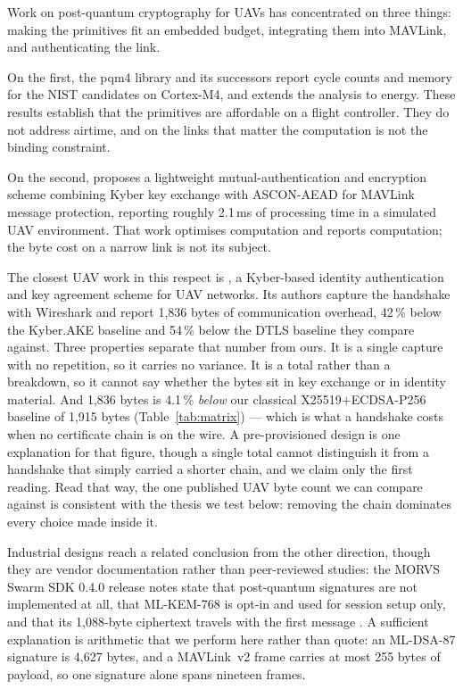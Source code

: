 \documentclass[drones,article,submit,pdftex,moreauthors]{Definitions/mdpi}
\newcommand{\mlkem}{ML-KEM}
\newcommand{\mldsa}{ML-DSA}
\newcommand{\mav}{MAVLink}
\begin{document}
Work on post-quantum cryptography for UAVs has concentrated on three
things: making the primitives fit an embedded budget, integrating them
into \mav{}, and authenticating the link.

On the first, the pqm4 library \cite{pqm4} and its successors report
cycle counts and memory for the NIST candidates on Cortex-M4, and
\cite{botros2019} extends the analysis to energy. These results
establish that the primitives are affordable on a flight controller.
They do not address airtime, and on the links that matter the
computation is not the binding constraint.

On the second, \cite{hussien2026pqmavlink} proposes a lightweight
mutual-authentication and encryption scheme combining Kyber key exchange
with ASCON-AEAD for \mav{} message protection, reporting roughly 2.1\,ms
of processing time in a simulated UAV environment. That work optimises
computation and reports computation; the byte cost on a narrow link is
not its subject.

The closest UAV work in this respect is \cite{xia2024ligkyx}, a
Kyber-based identity authentication and key agreement scheme for UAV
networks. Its authors capture the handshake with Wireshark and report
1{,}836 bytes of communication overhead, 42\,\% below the Kyber.AKE
baseline and 54\,\% below the DTLS baseline they compare against.
Three properties separate that number from ours. It is a single capture
with no repetition, so it carries no variance. It is a total rather
than a breakdown, so it cannot say whether the bytes sit in key
exchange or in identity material. And 1{,}836 bytes is 4.1\,\%
\emph{below} our classical X25519$+$ECDSA-P256 baseline of 1{,}915
bytes (Table~\ref{tab:matrix}) --- which is what a handshake costs when
no certificate chain is on the wire. A pre-provisioned design is one
explanation for that figure, though a single total cannot distinguish it
from a handshake that simply carried a shorter chain, and we claim only
the first reading. Read that way, the one published UAV byte count
we can compare against is consistent with the thesis we test below:
removing the chain dominates every choice made inside it.

Industrial designs reach a related conclusion from the
other direction, though they are vendor documentation rather than
peer-reviewed studies: the MORVS Swarm SDK 0.4.0 release notes state
that
post-quantum signatures are not implemented at all, that \mlkem{}-768 is
opt-in and used for session setup only, and that its 1{,}088-byte
ciphertext travels with the first message \cite{morvs2026swarm}. A
sufficient explanation is arithmetic that we perform here rather than
quote: an \mldsa{}-87 signature is 4{,}627 bytes, and a \mav{}~v2 frame
carries at most 255 bytes of payload, so one signature alone spans
nineteen frames.
\end{document}

